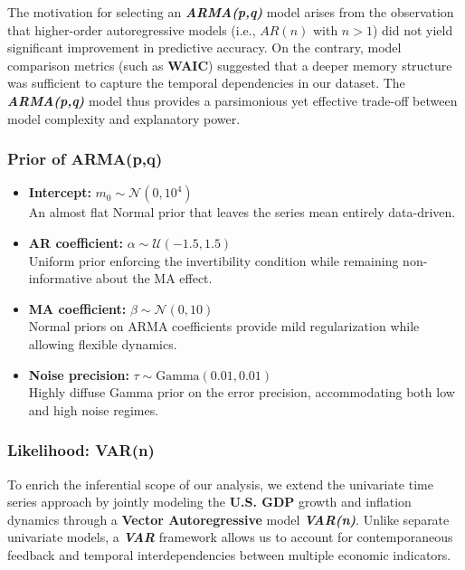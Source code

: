 \documentclass{Configuration_Files/PoliMi3i_thesis}
\begin{document}
The motivation for selecting an \textbf{\textit{ARMA(p,q)}} model arises from the observation that higher-order autoregressive models (i.e., $AR(n)$ with $n > 1$) did not yield significant improvement in predictive accuracy. On the contrary, model comparison metrics (such as \textbf{WAIC}) suggested that a deeper memory structure was sufficient to capture the temporal dependencies in our dataset. The \textbf{\textit{ARMA(p,q)}} model thus provides a parsimonious yet effective trade-off between model complexity and explanatory power.
\subsubsection{Prior of ARMA(p,q)}
\begin{itemize}
    \item \textbf{Intercept:} $m_0 \sim \mathcal{N}(0,10^4)$\\
    An almost flat Normal prior that leaves the series mean entirely data-driven.
    \item \textbf{AR coefficient:}  
    $\alpha \sim \mathcal{U}(-1.5,1.5)$\\
    Uniform prior enforcing the invertibility condition while remaining non-informative about the MA effect.
    \item \textbf{MA coefficient:}  
     $\beta \sim \mathcal{N}\left(0, 10 \right)$\\
    Normal priors on ARMA coefficients provide mild regularization while allowing flexible dynamics.
    \item \textbf{Noise precision:}  
    $\tau \sim \mathrm{Gamma}(0.01,0.01)$\\
    Highly diffuse Gamma prior on the error precision, accommodating both low and high noise regimes.
    
\end{itemize}
\subsubsection{Likelihood: VAR(n)}
To enrich the inferential scope of our analysis, we extend the univariate time series approach by jointly modeling the \textbf{U.S. GDP} growth and inflation dynamics through a \textbf{Vector Autoregressive} model \textbf{\textit{VAR(n)}}. Unlike separate univariate models, a \textbf{\textit{VAR}} framework allows us to account for contemporaneous feedback and temporal interdependencies between multiple economic indicators.
\end{document}
